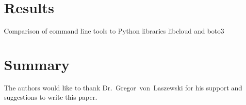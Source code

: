 \section{Results}

Comparison of command line tools to Python libraries libcloud and boto3

\section{Summary}

\begin{acks}

  The authors would like to thank Dr.~Gregor~von~Laszewski for his
  support and suggestions to write this paper.

\end{acks}


 

